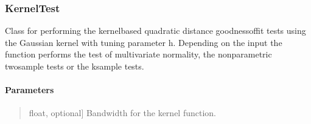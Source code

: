 \documentclass[letterpaper,10pt,english,openany,oneside]{sphinxmanual}
\begin{document}
\sphinxstepscope


\subsubsection{KernelTest}
\label{\detokenize{api_reference/generated/QuadratiK.kernel_test.KernelTest:kerneltest}}\label{\detokenize{api_reference/generated/QuadratiK.kernel_test.KernelTest::doc}}

\begin{fulllineitems}
\label{\detokenize{api_reference/generated/QuadratiK.kernel_test.KernelTest:QuadratiK.kernel_test.KernelTest}}
\pysigstartsignatures
{}
\pysigstopsignatures
\sphinxAtStartPar
Class for performing the kernel\sphinxhyphen{}based quadratic distance goodness\sphinxhyphen{}of\sphinxhyphen{}fit tests using 
the Gaussian kernel with tuning parameter h. Depending on the input  the function performs
the test of multivariate normality, the non\sphinxhyphen{}parametric two\sphinxhyphen{}sample tests or the k\sphinxhyphen{}sample tests.


\paragraph{Parameters}
\label{\detokenize{api_reference/generated/QuadratiK.kernel_test.KernelTest:parameters}}\begin{quote}
\begin{description}
\sphinxlineitem{h}{[}float, optional{]}
\sphinxAtStartPar
Bandwidth for the kernel function.


\end{description}
\end{quote}
\end{fulllineitems}
\end{document}
